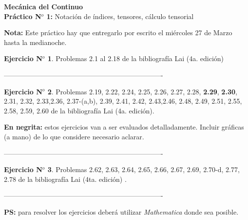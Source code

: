 \documentclass[12pt,a4paper]{article}
\theoremstyle{definition}
\newtheorem{example}{Ejercicio N$^o$}
\begin{document}
\begin{center}
{\textbf{Mecánica del Continuo} \\ 
 \textbf{Práctico N$^o$ 1:} Notación de índices, tensores, cálculo tensorial
}


\end{center}
\noindent \textbf{Nota:} Este práctico hay que entregarlo por escrito el miércoles 27 de Marzo hasta la medianoche.
\medskip



\begin{example}
Problemas 2.1 al 2.18 de la bibliografía Lai (4a. edición)
\end{example}
\begin{center}
----------------------------------------------------------------------
\end{center}


\begin{example}

Problemas 2.19, 2.22, 2.24, 2.25, 2.26, 2.27, 2.28, \textbf{2.29}, \textbf{2.30}, 2.31, 2.32, 2.33,2.36, 2.37-(a,b), 2.39, 2.41, 2.42, 2.43,2.46, 2.48, 2.49, 2.51, 2.55, 2.58, 2.59, 2.60
de la bibliografía Lai (4a. edición). 

\noindent \textbf{En negrita:} estos ejercicios van a ser evaluados detalladamente. Incluir gráficas (a mano) de lo que considere necesario aclarar.

\end{example}
\begin{center}
----------------------------------------------------------------------
\end{center}

\begin{example}
Problemas 2.62, 2.63, 2.64, 2.65, 2.66, 2.67, 2.69, 2.70-d, 2.77, 2.78 de la bibliografía Lai (4ta. edición) .
\end{example}
\begin{center}
----------------------------------------------------------------------
\end{center}

\noindent \textbf{PS:}  para resolver los ejercicios deberá utilizar \textit{Mathematica} donde sea posible.
\end{document}
